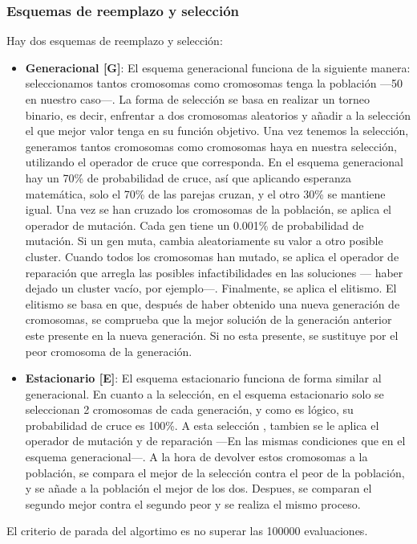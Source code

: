 \subsubsection{Esquemas de reemplazo y selección}
Hay dos esquemas de reemplazo y selección:
\begin{itemize}
   \item \textbf{Generacional [G]}: El esquema generacional funciona de la siguiente manera: seleccionamos tantos cromosomas como cromosomas tenga la población ---50 en nuestro caso---. La forma de selección se basa en realizar un torneo binario, es decir, enfrentar a dos cromosomas aleatorios y añadir a la selección el que mejor valor tenga en su función objetivo. Una vez tenemos la selección, generamos tantos cromosomas como cromosomas haya en nuestra selección, utilizando el operador de cruce que corresponda. En el esquema generacional hay un 70\% de probabilidad de cruce, así que aplicando esperanza matemática, solo el 70\% de las parejas cruzan, y el otro 30\% se mantiene igual. Una vez se han cruzado los cromosomas de la población, se aplica el operador de mutación. Cada gen tiene un 0.001\% de probabilidad de mutación. Si un gen muta, cambia aleatoriamente su valor a otro posible cluster. Cuando todos los cromosomas han mutado, se aplica el operador de reparación que arregla las posibles infactibilidades en las soluciones --- haber dejado un cluster vacío, por ejemplo---. Finalmente, se aplica el elitismo. El elitismo se basa en que, después de haber obtenido una nueva generación de cromosomas, se comprueba que la mejor solución de la generación anterior este presente en la nueva generación. Si no esta presente, se sustituye por el peor cromosoma de la generación.
   \item \textbf{Estacionario [E]}: El esquema estacionario funciona de forma similar al generacional. En cuanto a la selección, en el esquema estacionario solo se seleccionan 2 cromosomas de cada generación, y como es lógico, su probabilidad de cruce es 100\%. A esta selección , tambien se le aplica el operador de mutación y de reparación ---En las mismas condiciones que en el esquema generacional---. A la hora de devolver estos cromosomas a la población, se compara el mejor de la selección contra el peor de la población, y se añade a la población el mejor de los dos. Despues, se comparan el segundo mejor contra el segundo peor y se realiza el mismo proceso.
\end{itemize}
El criterio de parada del algortimo es no superar las 100000 evaluaciones.

